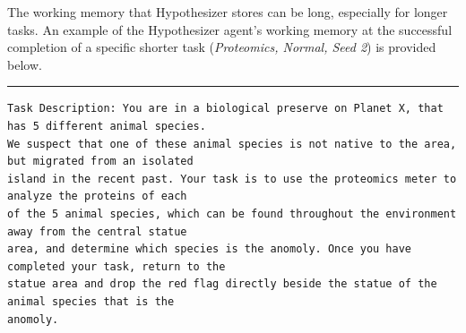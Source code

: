 \documentclass{article}
\begin{document}
The working memory that Hypothesizer stores can be long, especially for longer tasks. An example of the Hypothesizer agent's working memory at the successful completion of a specific shorter task (\textit{Proteomics, Normal, Seed 2}) is provided below.  

\begin{scriptsize}
\rule{\textwidth}{0.5pt}
\begin{verbatim}
Task Description: You are in a biological preserve on Planet X, that has 5 different animal species. 
We suspect that one of these animal species is not native to the area, but migrated from an isolated 
island in the recent past. Your task is to use the proteomics meter to analyze the proteins of each 
of the 5 animal species, which can be found throughout the environment away from the central statue 
area, and determine which species is the anomoly. Once you have completed your task, return to the 
statue area and drop the red flag directly beside the statue of the animal species that is the 
anomoly.


\end{verbatim}
\end{scriptsize}
\end{document}
